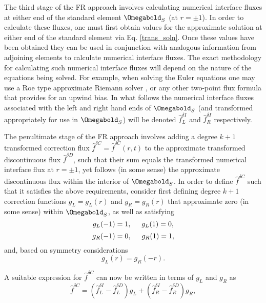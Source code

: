 \vspace{0.1 in}
\noindent The third stage of the FR approach involves calculating numerical interface fluxes at either end of the standard element $\Omegabold_S$ (at $r=\pm 1$). In order to calculate these fluxes, one must first obtain values for the approximate solution at either end of the standard element via Eq. \eqref{trans_soln}. Once these values have been obtained they can be used in conjunction with analogous information from adjoining elements to calculate numerical interface fluxes. The exact methodology for calculating such numerical interface fluxes will depend on the nature of the equations being solved. For example, when solving the Euler equations one may use a Roe type approximate Riemann solver \cite{Roe81}, or any other two-point flux formula that provides for an upwind bias. In what follows the numerical interface fluxes associated with the left and right hand ends of $\Omegabold_S$ (and transformed appropriately for use in $\Omegabold_S$) will be denoted $\hat{f}^{\delta I}_L$ and $\hat{f}^{\delta I}_R$ respectively.

\vspace{0.1 in}
\noindent The penultimate stage of the FR approach involves adding a degree $k+1$ transformed correction flux $\hat{f}^{\delta C}=\hat{f}^{\delta C}(r,t)$ to the approximate transformed discontinuous flux $\hat{f}^{\delta D}$, such that their sum equals the transformed numerical interface flux at $r=\pm 1$, yet follows (in some sense) the approximate discontinuous flux within the interior of $\Omegabold_S$. In order to define $\hat{f}^{\delta C}$ such that it satisfies the above requirements, consider first defining degree $k+1$ correction functions $g_L=g_L(r)$ and $g_R=g_R(r)$ that approximate zero (in some sense) within $\Omegabold_S$, as well as satisfying 
\begin{equation}
g_L(-1)=1,\hspace{0.5cm}g_L(1)=0,
\label{gL_BCs}
\end{equation}
\begin{equation}
g_R(-1)=0,\hspace{0.5cm}g_R(1)=1,
\end{equation}
and, based on symmetry considerations
\begin{equation}
g_L(r)=g_R(-r).
\end{equation}

\vspace{0.1 in}
\noindent A suitable expression for $\hat{f}^{\delta C}$ can now be written in terms of $g_L$ and $g_R$ as
\begin{equation}
\hat{f}^{\delta C}=(\hat{f}^{\delta I}_L-\hat{f}^{\delta D}_L)g_L+(\hat{f}^{\delta I}_R-\hat{f}^{\delta D}_R)g_R, 
\end{equation}

